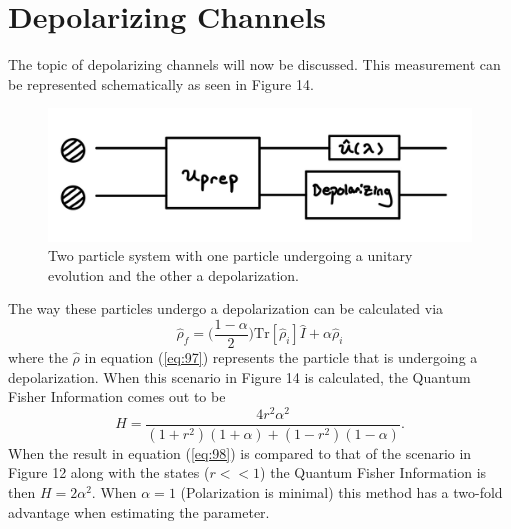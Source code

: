 \documentclass[twocolumn]{article}
\begin{document}
\section*{Depolarizing Channels}
The topic of depolarizing channels will now be discussed. This measurement can be represented schematically as seen in Figure 14.
\begin{figure}[h]
\begin{center}
\includegraphics[width=0.66\linewidth]{TP-Depolarizing.PNG}
\caption{Two particle system with one particle undergoing a unitary evolution and the other a depolarization.}
\end{center}
\end{figure}
\newline
The way these particles undergo a depolarization can be calculated via
\begin{equation}\label{eq:97}
\hat{\rho}_f=\Big(\frac{1-\alpha}{2}\Big)\text{Tr}[\hat{\rho}_i]\hat{I}+\alpha\hat{\rho}_i
\end{equation}
where the $\hat{\rho}$ in equation (\ref{eq:97}) represents the particle that is undergoing a depolarization. When this scenario in Figure 14 is calculated, the Quantum Fisher Information comes out to be
\begin{equation}\label{eq:98}
H=\frac{4r^2\alpha^2}{(1+r^2)(1+\alpha)+(1-r^2)(1-\alpha)}.
\end{equation}
When the result in equation (\ref{eq:98}) is compared to that of the scenario in Figure 12 along with the states ($r<<1$) the Quantum Fisher Information is then $H=2\alpha^2$. When $\alpha=1$ (Polarization is minimal) this method has a two-fold advantage when estimating the parameter.
\end{document}

